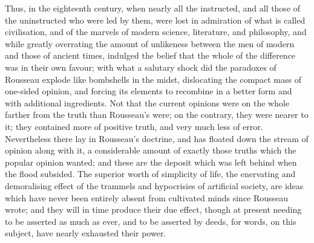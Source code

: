 \documentclass[11pt,openany]{book}
\begin{document}
Thus, in the eighteenth century, when nearly all the instructed, and all those of the uninstructed who were led by them, were lost in admiration of what is called civilisation, and of the marvels of modern science, literature, and philosophy, and while greatly overrating the amount of unlikeness between the men of modern and those of ancient times, indulged the belief that the whole of the difference was in their own favour; with what a salutary shock did the paradoxes of Rousseau explode like bombshells in the midst, dislocating the compact mass of one-sided opinion, and forcing its elements to recombine in a better form and with additional ingredients. Not that the current opinions were on the whole farther from the truth than Rousseau's were; on the contrary, they were nearer to it; they contained more of positive truth, and very much less of error. Nevertheless there lay in Rousseau's doctrine, and has floated down the stream of opinion along with it, a considerable amount of exactly those truths which the popular opinion wanted; and these are the deposit which was left behind when the flood subsided. The superior worth of simplicity of life, the enervating and demoralising effect of the trammels and hypocrisies of artificial society, are ideas which have never been entirely absent from cultivated minds since Rousseau wrote; and they will in time produce their due effect, though at present needing to be asserted as much as ever, and to be asserted by deeds, for words, on this subject, have nearly exhausted their power.
\end{document}
